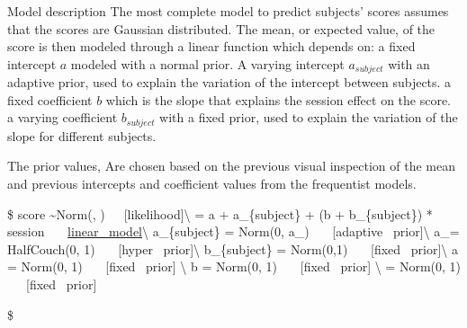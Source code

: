 \documentclass[
  ignorenonframetext,
]{beamer}
\begin{document}
\begin{frame}{Model description}
\protect\hypertarget{model-description-2}{}
The most complete model to predict subjects' scores assumes that the
scores are Gaussian distributed. The mean, or expected value, of the
score is then modeled through a linear function which depends on: a
fixed intercept \(a\) modeled with a normal prior. A varying intercept
\(a_{subject}\) with an adaptive prior, used to explain the variation of
the intercept between subjects. a fixed coefficient \(b\) which is the
slope that explains the session effect on the score. a varying
coefficient \(b_{subject}\) with a fixed prior, used to explain the
variation of the slope for different subjects.

The prior values, Are chosen based on the previous visual inspection of
the mean and previous intercepts and coefficient values from the
frequentist models.

\$ score \sim Norm(\mu, \sigma)~~~{[}likelihood{]}\textbackslash{} \mu =
a + a\_\{subject\} + (b + b\_\{subject\}) * session
~~~\protect\hyperlink{linear-model}{linear ~model}\textbackslash{}
a\_\{subject\} = Norm(0, a\_\sigma) ~~~{[}adaptive
~prior{]}\textbackslash{} a\_\sigma = HalfCouch(0, 1) ~~~{[}hyper
~prior{]}\textbackslash{} b\_\{subject\} = Norm(0,1) ~~~{[}fixed
~prior{]}\textbackslash{} a = Norm(0, 1) ~~~{[}fixed ~prior{]}
\textbackslash{} b = Norm(0, 1) ~~~{[}fixed ~prior{]} \textbackslash{}
\sigma = Norm(0, 1) ~~~{[}fixed ~prior{]}

\$
\end{frame}
\end{document}
